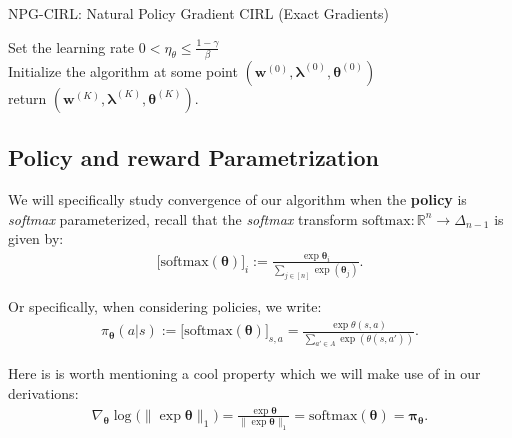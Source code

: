 \begin{algorithm}
    \SetAlgoLined
  \small
    \caption{NPG-CIRL: Natural Policy Gradient CIRL (Exact Gradients)} 
    \label{alg:npg-cirl}
      Set the learning rate $0<\eta_\theta \leq \frac{1-\gamma}{\beta}$ \\
      Initialize the algorithm at some point $(\bm{w}^{(0)},\bm{\lambda}^{(0)},\bm{\theta}^{(0)})$  \\
      return $(\bm{w}^{(K)},\bm{\lambda}^{(K)},\bm{\theta}^{(K)})$.
  \end{algorithm}

\subsection{Policy and reward Parametrization}

We will specifically study convergence of our algorithm when the \textbf{policy} is \textit{softmax} parameterized, recall that the \textit{softmax} transform $\text{softmax}:\mathbb{R}^n\rightarrow \Delta_{n-1}$ is given by:
\begin{align*}
    \big[\text{softmax}(\bm{\theta})\big]_i := \frac{\exp \bm{\theta}_i}{\sum_{j\in[n]} \exp(\bm{\theta}_j)}.
\end{align*}

Or specifically, when considering policies, we write:
\begin{align*}
    \pi_{\bm{\theta}} (a|s) := \big[\text{softmax}(\bm{\theta})\big]_{s,a} =  \frac{\exp \theta(s,a)}{\sum_{a'\in A} \exp(\theta(s,a'))}. 
\end{align*}

Here is is worth mentioning a cool property which we will make use of in our derivations:
\begin{align*}
    \nabla_{\bm{\theta}} \log \big( \| \exp \bm{\theta} \|_1 \big) = \frac{\exp \bm{\theta} }{\| \exp \bm{\theta}\|_1} = \text{softmax}(\bm{\theta}) = \bm{\pi}_{\bm{\theta}}.
\end{align*}

